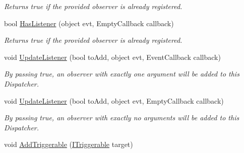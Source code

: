 \begin{DoxyCompactItemize}
\begin{DoxyCompactList}\small\item\em Returns true if the provided observer is already registered. \end{DoxyCompactList}\item 
\hypertarget{classstrange_1_1extensions_1_1dispatcher_1_1eventdispatcher_1_1impl_1_1_event_dispatcher_afd5119e0a7cc5311ea22cf888ac79154}{bool \hyperlink{classstrange_1_1extensions_1_1dispatcher_1_1eventdispatcher_1_1impl_1_1_event_dispatcher_afd5119e0a7cc5311ea22cf888ac79154}{Has\-Listener} (object evt, Empty\-Callback callback)}\label{classstrange_1_1extensions_1_1dispatcher_1_1eventdispatcher_1_1impl_1_1_event_dispatcher_afd5119e0a7cc5311ea22cf888ac79154}

\begin{DoxyCompactList}\small\item\em Returns true if the provided observer is already registered. \end{DoxyCompactList}\item 
\hypertarget{classstrange_1_1extensions_1_1dispatcher_1_1eventdispatcher_1_1impl_1_1_event_dispatcher_aea4c3220a647cc58b674845a3a3cd6b6}{void \hyperlink{classstrange_1_1extensions_1_1dispatcher_1_1eventdispatcher_1_1impl_1_1_event_dispatcher_aea4c3220a647cc58b674845a3a3cd6b6}{Update\-Listener} (bool to\-Add, object evt, Event\-Callback callback)}\label{classstrange_1_1extensions_1_1dispatcher_1_1eventdispatcher_1_1impl_1_1_event_dispatcher_aea4c3220a647cc58b674845a3a3cd6b6}

\begin{DoxyCompactList}\small\item\em By passing true, an observer with exactly one argument will be added to this Dispatcher. \end{DoxyCompactList}\item 
\hypertarget{classstrange_1_1extensions_1_1dispatcher_1_1eventdispatcher_1_1impl_1_1_event_dispatcher_a86eb8b71a793f8f06527296695e28c34}{void \hyperlink{classstrange_1_1extensions_1_1dispatcher_1_1eventdispatcher_1_1impl_1_1_event_dispatcher_a86eb8b71a793f8f06527296695e28c34}{Update\-Listener} (bool to\-Add, object evt, Empty\-Callback callback)}\label{classstrange_1_1extensions_1_1dispatcher_1_1eventdispatcher_1_1impl_1_1_event_dispatcher_a86eb8b71a793f8f06527296695e28c34}

\begin{DoxyCompactList}\small\item\em By passing true, an observer with exactly no arguments will be added to this Dispatcher. \end{DoxyCompactList}\item 
\hypertarget{classstrange_1_1extensions_1_1dispatcher_1_1eventdispatcher_1_1impl_1_1_event_dispatcher_a6b451f5aa08a3d9c8c4244adbcba28b2}{void \hyperlink{classstrange_1_1extensions_1_1dispatcher_1_1eventdispatcher_1_1impl_1_1_event_dispatcher_a6b451f5aa08a3d9c8c4244adbcba28b2}{Add\-Triggerable} (\hyperlink{interfacestrange_1_1extensions_1_1dispatcher_1_1api_1_1_i_triggerable}{I\-Triggerable} target)}\label{classstrange_1_1extensions_1_1dispatcher_1_1eventdispatcher_1_1impl_1_1_event_dispatcher_a6b451f5aa08a3d9c8c4244adbcba28b2}


\end{DoxyCompactItemize}
